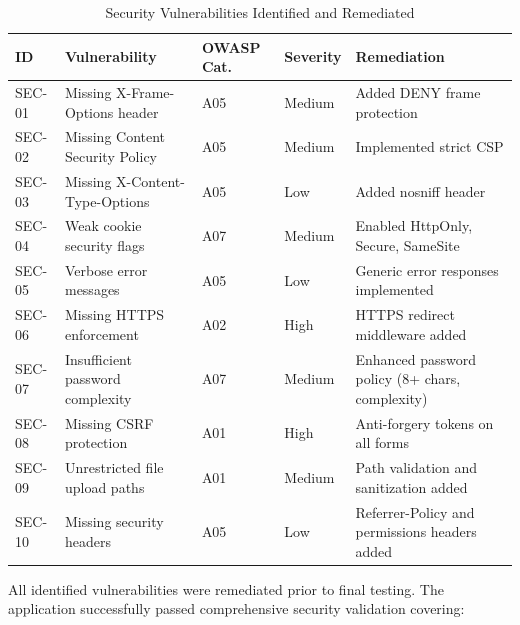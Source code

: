 \begin{table}[h!]
\centering
\caption{Security Vulnerabilities Identified and Remediated}
\label{tab:security_findings}
\renewcommand{\arraystretch}{1.15}
\setlength{\tabcolsep}{4pt}
\begin{tabularx}{\textwidth}{@{}
  >{\RaggedLeft\arraybackslash}p{1.2cm}
  >{\RaggedRight\arraybackslash}p{3.2cm}
  >{\RaggedLeft\arraybackslash}p{1.5cm}
  >{\RaggedLeft\arraybackslash}p{1.5cm}
  >{\RaggedRight\arraybackslash}X
@{}}
\toprule
\textbf{ID} & \textbf{Vulnerability} & \textbf{OWASP Cat.} & \textbf{Severity} & \textbf{Remediation} \\
\midrule
SEC-01 & Missing X-Frame-Options header & A05 & Medium & Added DENY frame protection \\
SEC-02 & Missing Content Security Policy & A05 & Medium & Implemented strict CSP \\
SEC-03 & Missing X-Content-Type-Options & A05 & Low & Added nosniff header \\
SEC-04 & Weak cookie security flags & A07 & Medium & Enabled HttpOnly, Secure, SameSite \\
SEC-05 & Verbose error messages & A05 & Low & Generic error responses implemented \\
SEC-06 & Missing HTTPS enforcement & A02 & High & HTTPS redirect middleware added \\
SEC-07 & Insufficient password complexity & A07 & Medium & Enhanced password policy (8+ chars, complexity) \\
SEC-08 & Missing CSRF protection & A01 & High & Anti-forgery tokens on all forms \\
SEC-09 & Unrestricted file upload paths & A01 & Medium & Path validation and sanitization added \\
SEC-10 & Missing security headers & A05 & Low & Referrer-Policy and permissions headers added \\
\bottomrule
\end{tabularx}
\end{table}

All identified vulnerabilities were remediated prior to final testing. The application successfully passed comprehensive security validation covering:

